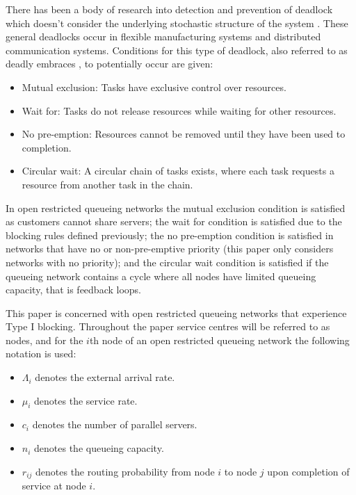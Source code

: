 \documentclass{article}
\numberwithin{equation}{section}
\begin{document}
There has been a body of research into detection and prevention of deadlock which doesn't consider the underlying stochastic structure of the system \cite{coffmanelphick71, reveliotis15a, reveliotis15b}.
These general deadlocks occur in flexible manufacturing systems and distributed communication systems.
Conditions for this type of deadlock, also referred to as deadly embraces \cite{coffmanelphick71}, to potentially occur are given:
\begin{itemize}
  \item Mutual exclusion: Tasks have exclusive control over resources.
  \item Wait for: Tasks do not release resources while waiting for other resources.
  \item No pre-emption: Resources cannot be removed until they have been used to completion.
  \item Circular wait: A circular chain of tasks exists, where each task requests a resource from another task in the chain.
\end{itemize}

In open restricted queueing networks the mutual exclusion condition is satisfied as customers cannot share servers; the wait for condition is satisfied due to the blocking rules defined previously; the no pre-emption condition is satisfied in networks that have no or non-pre-emptive priority (this paper only considers networks with no priority); and the circular wait condition is satisfied if the queueing network contains a cycle where all nodes have limited queueing capacity, that is feedback loops.

This paper is concerned with open restricted queueing networks that experience Type I blocking.
Throughout the paper service centres will be referred to as nodes, and for the $i$th node of an open restricted queueing network the following notation is used:

\begin{itemize}
  \item $\Lambda_i$ denotes the external arrival rate.
  \item $\mu_i$ denotes the service rate.
  \item $c_i$ denotes the number of parallel servers.
  \item $n_i$ denotes the queueing capacity.
  \item $r_{ij}$ denotes the routing probability from node $i$ to node $j$ upon completion of service at node $i$.
\end{itemize}
\end{document}
